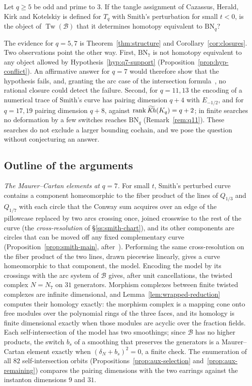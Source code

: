 \begin{question}\label{q:arc}
Let $q\ge5$ be odd and prime to $3$. If the tangle assignment of Cazassus, Herald, Kirk and Kotelskiy is
defined for $T_q$ with Smith's perturbation for small $t<0$, is the object of $\operatorname{Tw}(\mathcal B)$
that it determines homotopy equivalent to $\mathrm{BN}_q$?
\end{question}

The evidence for $q=5,7$ is Theorem~\ref{thm:structure} and Corollary~\ref{cor:closures}. Two
observations point the other way. First, $\mathrm{BN}_7$ is not homotopy equivalent to any object allowed
by Hypothesis~\ref{hyp:q7-support} (Proposition~\ref{prop:hyp-conflict}). An affirmative answer for
$q=7$ would therefore show that the hypothesis fails, and, granting the arc case of the intersection
formula~\cite[Thm.~5.25]{KWZ}, no rational closure could detect the failure. Second, for $q=11,13$ the encoding of a numerical trace of Smith's curve has pairing dimension
$q+4$ with $E_{-1/2}$, and for $q=17,19$ pairing dimension $q+8$, against $\operatorname{rank}\widetilde{\mathit{Kh}}(K_q)=q+2$; in
finite searches no deformation by a few switches reaches $\mathrm{BN}_q$ (Remark~\ref{rem:q11}). These
searches do not exclude a larger bounding cochain, and we pose the question without conjecturing an answer.

\subsection{Outline of the arguments}
\emph{The Maurer--Cartan elements at $q=7$.} For small $t$, Smith's perturbed curve contains a component
homeomorphic to the fiber product of the lines of $Q_{1/3}$ and $Q_{1/7}$ with each circle that the Conway sum
acquires over an edge of the pillowcase replaced by two arcs crossing once, joined crosswise to the rest of
the curve (the \emph{cross-resolution} of \S\ref{ss:smith-chart}), and its other components are circles
that can be moved off any fixed complementary curve (Proposition~\ref{prop:smith-main}, after~\cite{Smith}).
Performing the same cross-resolution on the fiber product of the two lines, drawn piecewise linearly, gives a
curve homeomorphic to that component, the model. Encoding the model by its crossings with the arc system of
$\mathcal B$ gives, after unit cancellations, the twisted complex $N=N_7$ on $31$ generators. Morphism
complexes between finite twisted complexes are infinite dimensional, and Lemma~\ref{lem:wrapped-reduction}
computes their homology exactly: the morphism complex is a mapping cone onto free modules over the
polynomial rings of the three faces, and its homology is finite dimensional exactly when those modules are
acyclic over the fraction fields. Each self-intersection of the model has two smoothings; since
$\mathcal B$ has no higher products, the switch $b_s$ of a smoothing that preserves the generators is a
Maurer--Cartan element exactly when $(\delta_N+b_s)^2=0$, a finite check. The enumeration of all $82$
self-intersection orbits (Propositions~\ref{prop:aux-selection} and~\ref{prop:aux-remaining}) compares the
pairing dimensions with the two earrings against the instanton dimensions $9$ and $31$.

